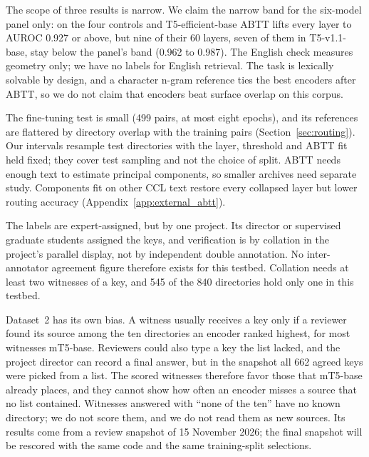 \documentclass[11pt]{article}
\begin{document}
The scope of three results is narrow.
We claim the narrow band for the six-model panel only: on the four controls and T5-efficient-base ABTT lifts every layer to AUROC 0.927 or above, but nine of their 60 layers, seven of them in T5-v1.1-base, stay below the panel's band (0.962 to 0.987).
The English check measures geometry only; we have no labels for English retrieval.
The task is lexically solvable by design, and a character n-gram reference ties the best encoders after ABTT, so we do not claim that encoders beat surface overlap on this corpus.

The fine-tuning test is small (499 pairs, at most eight epochs), and its references are flattered by directory overlap with the training pairs (Section~\ref{sec:routing}).
Our intervals resample test directories with the layer, threshold and ABTT fit held fixed; they cover test sampling and not the choice of split.
ABTT needs enough text to estimate principal components, so smaller archives need separate study.
Components fit on other CCL text restore every collapsed layer but lower routing accuracy (Appendix~\ref{app:external_abtt}).

The labels are expert-assigned, but by one project.
Its director or supervised graduate students assigned the keys, and verification is by collation in the project's parallel display, not by independent double annotation.
No inter-annotator agreement figure therefore exists for this testbed.
Collation needs at least two witnesses of a key, and 545 of the 840 directories hold only one in this testbed.

Dataset~2 has its own bias.
A witness usually receives a key only if a reviewer found its source among the ten directories an encoder ranked highest, for most witnesses mT5-base.
Reviewers could also type a key the list lacked, and the project director can record a final answer, but in the snapshot all 662 agreed keys were picked from a list.
The scored witnesses therefore favor those that mT5-base already places, and they cannot show how often an encoder misses a source that no list contained.
Witnesses answered with ``none of the ten'' have no known directory; we do not score them, and we do not read them as new sources.
Its results come from a review snapshot of 15 November 2026; the final snapshot will be rescored with the same code and the same training-split selections.
\end{document}
